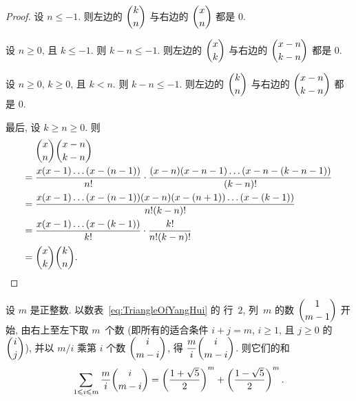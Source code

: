 \documentclass[../libro.tex]{subfiles}
\begin{document}
\begin{proof}
    设 \(n \leq -1\).
    则左边的 \(\dbinom{k}{n}\) 与右边的 \(\dbinom{x}{n}\)
    都是 \(0\).

    设 \(n \geq 0\), 且 \(k \leq -1\).
    则 \(k - n \leq -1\).
    则左边的 \(\dbinom{x}{k}\) 与右边的 \(\dbinom{x-n}{k-n}\)
    都是 \(0\).

    设 \(n \geq 0\), \(k \geq 0\), 且 \(k < n\).
    则 \(k - n \leq -1\).
    则左边的 \(\dbinom{k}{n}\) 与右边的 \(\dbinom{x-n}{k-n}\)
    都是 \(0\).

    最后, 设 \(k \geq n \geq 0\).
    则
    \begin{align*}
        &
        \dbinom{x}{n} \dbinom{x-n}{k-n}
        \\
        = {} &
        \frac{x (x - 1) \dots (x - (n - 1))}{n!}
        \cdot
        \frac{(x - n) (x - n - 1) \dots (x - n - (k - n - 1))}{(k - n)!}
        \\
        = {} &
        \frac{x (x - 1) \dots (x - (n - 1)) (x - n) (x - (n + 1))
        \dots (x - (k - 1))}{n! (k - n)!}
        \\
        = {} &
        \frac{x (x - 1) \dots (x - (k - 1))}{k!}
        \cdot
        \frac{k!}{n! (k - n)!}
        \\
        = {} &
        \dbinom{x}{k} \dbinom{k}{n}.
        \qedhere
    \end{align*}
\end{proof}

\begin{theorem}
    设 \(m\) 是正整数.
    以数表~\eqref{eq:TriangleOfYangHui} 的%
    行~\(2\), 列~\(m\) 的数 \(\dbinom{1}{m-1}\) 开始,
    由右上至左下取 \(m\)~个数
    (即所有的适合条件 \(i + j = m\), %
    \(i \geq 1\), 且 \(j \geq 0\) 的
    \(\dbinom{i}{j}\)), %
    并以 \(m/i\) 乘第 \(i\) 个数
    \(\dbinom{i}{m-i}\),
    得 \(\dfrac{m}{i} \dbinom{i}{m-i}\).
    则它们的和
    \begin{align*}
        \sum_{1 \leq i \leq m} {\dfrac{m}{i} \dbinom{i}{m - i}}
        = \left(\frac{1 + \sqrt{5}}{2}\right)^m
        + \left(\frac{1 - \sqrt{5}}{2}\right)^m.
    \end{align*}
\end{theorem}
\end{document}
